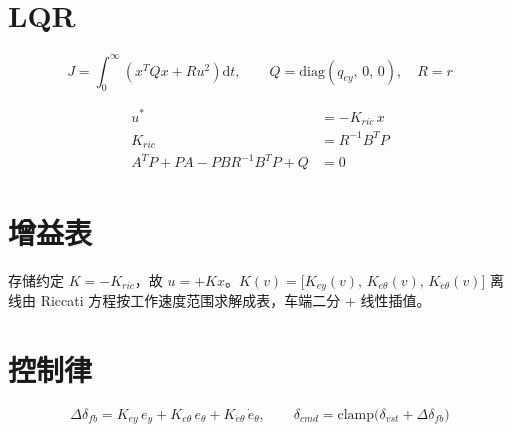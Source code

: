 \documentclass[11pt,a4paper]{article}
\begin{document}
\section{LQR}

\begin{samepage}

\begin{equation}
J=\int_0^\infty \left(x^T Q x + R u^2\right)\mathrm{d}t,
\qquad
Q=\mathrm{diag}(q_{ey},\,0,\,0),\quad R=r
\end{equation}

\begin{align}
u^* &= -K_{ric}\,x \\
K_{ric} &= R^{-1}B^T P \\
A^T P + P A - P B R^{-1} B^T P + Q &= 0
\end{align}

\end{samepage}

\section{增益表}

存储约定 $K=-K_{ric}$，故 $u=+Kx$。$K(v)=\big[K_{ey}(v),\,K_{e\theta}(v),\,K_{\dot e\theta}(v)\big]$
离线由 Riccati 方程按工作速度范围求解成表，车端二分 + 线性插值。

\section{控制律}

\begin{equation}
\Delta\delta_{fb}=K_{ey}\,e_y + K_{e\theta}\,e_\theta + K_{\dot e\theta}\,\dot e_\theta,
\qquad
\delta_{cmd}=\mathrm{clamp}\big(\delta_{vst}+\Delta\delta_{fb}\big)
\end{equation}
\end{document}
